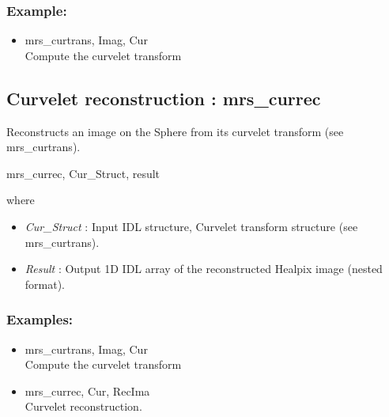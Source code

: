 \subsubsection*{Example:} 
\begin{itemize}
\item mrs\_curtrans, Imag, Cur \\
Compute the curvelet transform
\end{itemize}



\subsection{Curvelet reconstruction : mrs\_currec}
Reconstructs an image on the Sphere from its curvelet transform (see mrs\_curtrans).   
{\bf
\begin{center}
       mrs\_currec, Cur\_Struct, result  
\end{center}}
where
\begin{itemize}
\item {\em Cur\_Struct} : Input IDL structure, Curvelet transform structure (see mrs\_curtrans).
\item {\em Result} : Output 1D IDL array of the reconstructed Healpix image (nested format).
\end{itemize}

\subsubsection*{Examples:} 
\begin{itemize}
\item mrs\_curtrans, Imag, Cur   \\
Compute the curvelet transform
\item mrs\_currec,  Cur, RecIma \\
Curvelet reconstruction.
\end{itemize}




